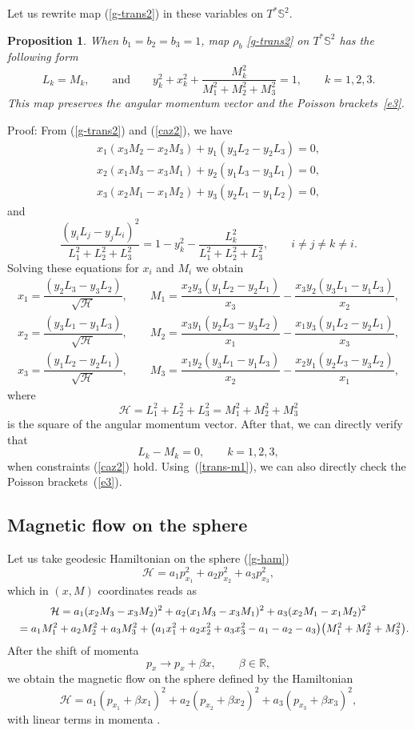 \documentclass[10pt,a4paper]{amsart}
\numberwithin{equation}{section}
\newtheorem{Proposition}[Theorem]{Proposition}
 { \theoremstyle{definition}
\newtheorem{Definition}[Theorem]{Definition}
\newtheorem{Note}[Theorem]{Note}
\newtheorem{Example}[Theorem]{Example}
\newtheorem{Remark}[Theorem]{Remark} }
\begin{document}
Let us rewrite map (\ref{g-trans2}) in these variables on $T^*\mathbb S^2$.
\begin{Proposition}
When $b_1=b_2=b_3=1$, map $\rho_b$ \eqref{g-trans2} on $T^*\mathbb S^2$ has the following form
\begin{equation}\label{e3-rho}
 L_k=M_k ,\qquad\mbox{and}\qquad y_k^2+x_k^2+\frac{M_k^2}{M_1^2+M_2^2+M_3^2}=1 ,\qquad k=1,2,3.
 \end{equation}
This map preserves the angular momentum vector and the Poisson brackets~\eqref{e3}.
\end{Proposition}
Proof: From (\ref{g-trans2}) and (\ref{caz2}), we have
\begin{gather*}
x_1(x_3M_2 - x_2 M_3) + y_1(y_3L_2 -y_2 L_3)=0 ,\\
x_2(x_1M_3 -x_3 M_1) + y_2(y_1L_3-y_3L_1) =0 ,\\
x_3(x_2 M_1 -x_1 M_2) + y_3(y_2L_1 -y_1 L_2) =0 ,
\end{gather*}
and
\[
\frac{(y_iL_j-y_jL_i)^2}{L_1^2+L_2^2+L_3^2}=1-y_k^2-\frac{L_k^2}{L_1^2+L_2^2+L_3^2} ,\qquad i\neq j\neq k\neq i .
\]
Solving these equations for $x_i$ and $M_i$ we obtain
\begin{gather}
 x_1=\dfrac{(y_2L_3-y_3L_2)}{\sqrt{\mathcal H}} ,\qquad
M_1=\dfrac{x_2y_3(y_1L_2 -y_2 L_1)}{x_3} -\dfrac{ x_3y_2(y_3L_1 -y_1 L_3)}{x_2} ,\nonumber\\
x_2=\dfrac{(y_3L_1-y_1L_3)}{\sqrt{\mathcal H}} ,\qquad
M_2=\dfrac{ x_3y_1(y_2L_3 - y_3L_2)}{x_1}-\dfrac{x_1y_3(y_1L_2-y_2L_1)}{x_3} ,\nonumber\\
x_3=\dfrac{(y_1L_2-y_2L_1)}{\sqrt{\mathcal H}} ,\qquad
M_3=\dfrac{x_1y_2(y_3L_1 -y_1L_3)}{x_2}-\dfrac{x_2y_1(y_2L_3 -y_3L_2)}{x_1},\label{trans-m1}
\end{gather}
where
\[\mathcal H=L_1^2+L_2^2+L_3^2=M_1^2+M_2^2+M_3^2\]
is the square of the angular momentum vector. After that, we can directly verify that
\[
L_k-M_k=0 ,\qquad k=1,2,3,
\]
when constraints (\ref{caz2}) hold. Using~(\ref{trans-m1}), we can also directly check the Poisson brackets~(\ref{e3}).

\subsection{Magnetic flow on the sphere}
Let us take geodesic Hamiltonian on the sphere (\ref{g-ham})
\[
\mathcal H=a_1p_{x_1}^2+a_2p_{x_2}^2+a_3p_{x_3}^2 ,
\]
which in $(x,M)$ coordinates reads as
\begin{gather*}
\mathcal H= a_1(x_2M_3-x_3M_2)^2 +a_2(x_1M_3-x_3M_1)^2 + a_3(x_2M_1 - x_1M_2)^2  \\
\hphantom{\mathcal H}{} = a_1M_1^2 + a_2M_2^2 + a_3M_3^2 + \big(a_1x_1^2 + a_2x_2^2 + a_3x_3^2 - a_1 -a_2 - a_3\big)\big(M_1^2 + M_2^2 + M_3^2\big) .
\end{gather*}
After the shift of momenta
\[p_x\to p_x+\beta x ,\qquad \beta\in\mathbb R ,\]
we obtain the magnetic flow on the sphere defined by the Hamiltonian
\begin{equation}\label{c-ham2b}
\mathcal H=a_1(p_{x_1}+\beta x_1)^2+a_2(p_{x_2}+\beta x_2)^2+a_3(p_{x_3}+\beta x_3)^2,
\end{equation}
with linear terms in momenta \cite{bm,dor,win00}.
\end{document}
